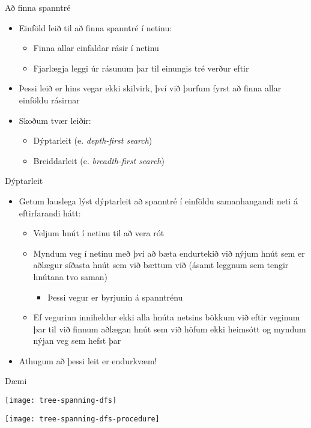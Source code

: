 \documentclass{beamer}
\begin{document}
\begin{frame}{Að finna spanntré}
\begin{itemize}
 \item Einföld leið til að finna spanntré í netinu: 
 \begin{itemize}
  \item Finna allar einfaldar rásir í netinu
  \item Fjarlægja leggi úr rásunum þar til einungis tré verður eftir
 \end{itemize}
 \item Þessi leið er hins vegar ekki skilvirk, því við þurfum fyrst að finna allar einföldu rásirnar
 \item Skoðum tvær leiðir:
 \begin{itemize}
  \item Dýptarleit (e. \emph{depth-first search})
  \item Breiddarleit (e. \emph{breadth-first search})
 \end{itemize}
\end{itemize}
\end{frame}

\begin{frame}{Dýptarleit}
\begin{itemize}
 \item Getum lauslega lýst dýptarleit að spanntré í einföldu samanhangandi neti á eftirfarandi hátt:
 \begin{itemize}
  \item Veljum hnút í netinu til að vera rót
  \item Myndum veg í netinu með því að bæta endurtekið við nýjum hnút sem er aðlægur síðasta hnút sem við bættum við (ásamt leggnum sem tengir hnútana tvo saman)
  \begin{itemize}
   \item Þessi vegur er byrjunin á spanntrénu
  \end{itemize}
  \item Ef vegurinn inniheldur ekki alla hnúta netsins bökkum við eftir veginum þar til við finnum aðlægan hnút sem við höfum ekki heimsótt og myndum nýjan veg sem hefst þar
 \end{itemize}
 \item Athugum að þessi leit er endurkvæm!
\end{itemize}
\end{frame}

\begin{frame}{Dæmi}
\begin{center}
\texttt{[image: tree-spanning-dfs]}

\pause
\texttt{[image: tree-spanning-dfs-procedure]}
\end{center}

\end{frame}
\end{document}
